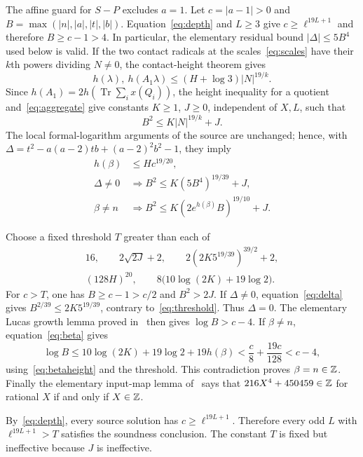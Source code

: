 \documentclass[11pt,a4paper]{article}
\DeclareMathOperator{\Tr}{Tr}
\begin{document}
The affine guard for $S-P$ excludes $a=1$. Let $c=|a-1|>0$ and
$B=\max(|n|,|a|,|t|,|b|)$. Equation~\eqref{eq:depth} and $L\ge3$
give $c\ge\ell^{19L+1}$ and therefore $B\ge c-1>4$.
In particular, the elementary residual bound $|\Delta|\le5B^4$
used below is valid. If the two contact radicals at the
scales~\eqref{eq:scales} have their $k$th powers dividing
$N\ne0$, the contact-height theorem gives
\[
 h(\lambda),\ h(A_1\lambda)
       \le(H+\log3)|N|^{19/k}.
\]
Since $h(A_1)=2h(\Tr\sum_i x(Q_i))$, the height inequality
for a quotient and~\eqref{eq:aggregate} give constants
$K\ge1$, $J\ge0$, independent of $X,L$, such that
\begin{equation}\label{eq:commonheight}
                 B^2\le K|N|^{19/k}+J.
\end{equation}
The local formal-logarithm arguments of the source are
unchanged; hence, with
$\Delta=t^2-a(a-2)tb+(a-2)^2b^2-1$, they imply
\begin{align}
 h(\beta)&\le Hc^{19/20},\label{eq:betaheight}\\
 \Delta\ne0&\Longrightarrow
 B^2\le K(5B^4)^{19/39}+J,\label{eq:delta}\\
 \beta\ne n&\Longrightarrow
 B^2\le K(2e^{h(\beta)}B)^{19/10}+J.\label{eq:beta}
\end{align}

Choose a fixed threshold $T$ greater than each of
\begin{equation}\label{eq:threshold}
 \begin{gathered}
 16,\qquad 2\sqrt{2J}+2,\qquad
 2(2K5^{19/39})^{39/2}+2,\\
 (128H)^{20},\qquad
 8\bigl(10\log(2K)+19\log2\bigr).
 \end{gathered}
\end{equation}
For $c>T$, one has $B\ge c-1>c/2$ and $B^2>2J$.
If $\Delta\ne0$, equation~\eqref{eq:delta} gives
$B^{2/39}\le2K5^{19/39}$, contrary to~\eqref{eq:threshold}.
Thus $\Delta=0$. The elementary Lucas growth lemma proved
in~\cite{Baseline} then gives $\log B>c-4$.
If $\beta\ne n$, equation~\eqref{eq:beta} gives
\[
 \log B\le10\log(2K)+19\log2+19h(\beta)
       <\frac c8+\frac{19c}{128}<c-4,
\]
using~\eqref{eq:betaheight} and the threshold. This contradiction
proves $\beta=n\in\mathbb Z$. Finally the elementary input-map
lemma of~\cite{Baseline} says that
$216X^4+450459\in\mathbb Z$ for rational $X$ if and only if
$X\in\mathbb Z$.

By~\eqref{eq:depth}, every source solution has
$c\ge\ell^{19L+1}$. Therefore every odd $L$ with
$\ell^{19L+1}>T$ satisfies the soundness conclusion. The
constant $T$ is fixed but ineffective because $J$ is ineffective.
\end{document}
